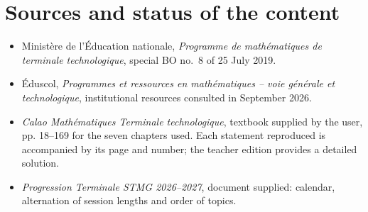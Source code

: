\chapter{Sources and status of the content}
\begin{itemize}
\item Ministère de l'Éducation nationale, \emph{Programme de mathématiques de terminale technologique}, special BO no.~8 of 25 July 2019.
\item Éduscol, \emph{Programmes et ressources en mathématiques -- voie générale et technologique}, institutional resources consulted in September 2026.
\item \emph{Calao Mathématiques Terminale technologique}, textbook supplied by the user, pp. 18--169 for the seven chapters used. Each statement reproduced is accompanied by its page and number; the teacher edition provides a detailed solution.
\item \emph{Progression Terminale STMG 2026--2027}, document supplied: calendar, alternation of session lengths and order of topics.
\end{itemize}
